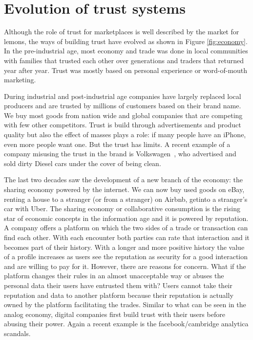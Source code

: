 \section{Evolution of trust systems}
Although the role of trust for marketplaces is well described by the market for lemons, the ways of 
building trust have evolved as shown in Figure \ref{fig:economy}. In the pre-industrial age, most economy and trade was done in local
communities with families that trusted each other over generations and traders that returned year
after year. Trust was mostly based on personal experience or word-of-mouth marketing. 

During industrial and post-industrial age companies have largely replaced local producers and are 
trusted by millions of customers based on their brand name. We buy most goods from nation wide and 
global companies that are competing with few other competitors. Trust is build through advertisements
and product quality but also the effect of masses plays a role: if many people have an iPhone, even 
more people want one. But the trust has limits. A recent example of a company misusing the trust in 
the brand is Volkswagen~\cite{VWDiesel}, who advertised and sold dirty Diesel cars under the cover 
of being clean. 

The last two decades saw the development of a new branch of the economy: the sharing economy powered
by the internet. We can now buy used goods on eBay, renting a house to a stranger (or from a 
stranger) on Airbnb, getinto a stranger's car with Uber. The sharing economy or collaborative consumption is the 
rising star of economic concepts in the information age and it is powered by reputation. A company 
offers a platform on which the two sides of a trade or transaction can find each other. With each 
encounter both parties can rate that interaction and it becomes part of their history. With a longer
and more positive history the value of a profile increases as users see the reputation as security
for a good interaction and are willing to pay for it. However, there are reasons for concern. What
if the platform changes their rules in an almost unacceptable way or abuses the personal data their
users have entrusted them with? Users cannot take their reputation and data to another platform
because their reputation is actually owned by the platform facilitating the trades. Similar to what
can be seen in the analog economy, digital companies first build trust with their users before 
abusing their power. Again a recent example is the facebook/cambridge analytica scandals.~\cite{facebook} 

